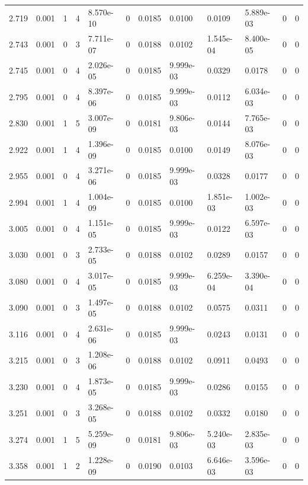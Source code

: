\documentclass[preview]{standalone}
\begin{document}
{{{\begin{tabular}{L{1.2cm}C{1.2cm} C{0.3cm}C{0.5cm} C{1.4cm}C{1.4cm} C{1.4cm}C{1.4cm} C{1.6cm}C{1.6cm} C{1.6cm}C{1.6cm}}
  2.719  &  0.001  & 1     &  4 &  8.570e-10  & 0  &  0.0185&   0.0100& 0.0109 & 5.889e-03   &  0 & 0  \\ 
  2.743  &  0.001  & 0     &  3 &  7.711e-07  & 0  &  0.0188&   0.0102& 1.545e-04 & 8.400e-05   &  0 & 0  \\ 
  2.745  &  0.001  & 0     &  4 &  2.026e-05  & 0  &  0.0185&   9.999e-03& 0.0329 & 0.0178   &  0 & 0  \\ 
  2.795  &  0.001  & 0     &  4 &  8.397e-06  & 0  &  0.0185&   9.999e-03& 0.0112 & 6.034e-03   &  0 & 0  \\ 
  2.830  &  0.001  & 1     &  5 &  3.007e-09  & 0  &  0.0181&   9.806e-03& 0.0144 & 7.765e-03   &  0 & 0  \\ 
  2.922  &  0.001  & 1     &  4 &  1.396e-09  & 0  &  0.0185&   0.0100& 0.0149 & 8.076e-03   &  0 & 0  \\ 
  2.955  &  0.001  & 0     &  4 &  3.271e-06  & 0  &  0.0185&   9.999e-03& 0.0328 & 0.0177   &  0 & 0  \\ 
  2.994  &  0.001  & 1     &  4 &  1.004e-09  & 0  &  0.0185&   0.0100& 1.851e-03 & 1.002e-03   &  0 & 0  \\ 
  3.005  &  0.001  & 0     &  4 &  1.151e-05  & 0  &  0.0185&   9.999e-03& 0.0122 & 6.597e-03   &  0 & 0  \\ 
  3.030  &  0.001  & 0     &  3 &  2.733e-05  & 0  &  0.0188&   0.0102& 0.0289 & 0.0157   &  0 & 0  \\ 
  3.080  &  0.001  & 0     &  4 &  3.017e-05  & 0  &  0.0185&   9.999e-03& 6.259e-04 & 3.390e-04   &  0 & 0  \\ 
  3.090  &  0.001  & 0     &  3 &  1.497e-05  & 0  &  0.0188&   0.0102& 0.0575 & 0.0311   &  0 & 0  \\ 
  3.116  &  0.001  & 0     &  4 &  2.631e-06  & 0  &  0.0185&   9.999e-03& 0.0243 & 0.0131   &  0 & 0  \\ 
  3.215  &  0.001  & 0     &  3 &  1.208e-06  & 0  &  0.0188&   0.0102& 0.0911 & 0.0493   &  0 & 0  \\ 
  3.230  &  0.001  & 0     &  4 &  1.873e-05  & 0  &  0.0185&   9.999e-03& 0.0286 & 0.0155   &  0 & 0  \\ 
  3.251  &  0.001  & 0     &  3 &  3.268e-05  & 0  &  0.0188&   0.0102& 0.0332 & 0.0180   &  0 & 0  \\ 
  3.274  &  0.001  & 1     &  5 &  5.259e-09  & 0  &  0.0181&   9.806e-03& 5.240e-03 & 2.835e-03   &  0 & 0  \\ 
  3.358  &  0.001  & 1     &  2 &  1.228e-09  & 0  &  0.0190&   0.0103& 6.646e-03 & 3.596e-03   &  0 & 0  \\ 

\end{tabular}}}}
\end{document}

